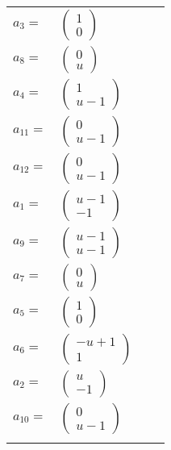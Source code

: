 \documentclass[1p]{elsarticle_modified}
\theoremstyle{definition}
\begin{document}
\begin{tabular}{m{7pt} m{180pt} m{7pt} m{180pt} }
\flushright $a_{3}=$&$\begin{pmatrix}1\\0\end{pmatrix}$ \\
\flushright $a_{8}=$&$\begin{pmatrix}0\\u\end{pmatrix}$ \\
\flushright $a_{4}=$&$\begin{pmatrix}1\\u-1\end{pmatrix}$ \\
\flushright $a_{11}=$&$\begin{pmatrix}0\\u-1\end{pmatrix}$ \\
\flushright $a_{12}=$&$\begin{pmatrix}0\\u-1\end{pmatrix}$ \\
\flushright $a_{1}=$&$\begin{pmatrix}u-1\\-1\end{pmatrix}$ \\
\flushright $a_{9}=$&$\begin{pmatrix}u-1\\u-1\end{pmatrix}$ \\
\flushright $a_{7}=$&$\begin{pmatrix}0\\u\end{pmatrix}$ \\
\flushright $a_{5}=$&$\begin{pmatrix}1\\0\end{pmatrix}$ \\
\flushright $a_{6}=$&$\begin{pmatrix}- u+1\\1\end{pmatrix}$ \\
\flushright $a_{2}=$&$\begin{pmatrix}u\\-1\end{pmatrix}$ \\
\flushright $a_{10}=$&$\begin{pmatrix}0\\u-1\end{pmatrix}$\\&\end{tabular}
\end{document}
